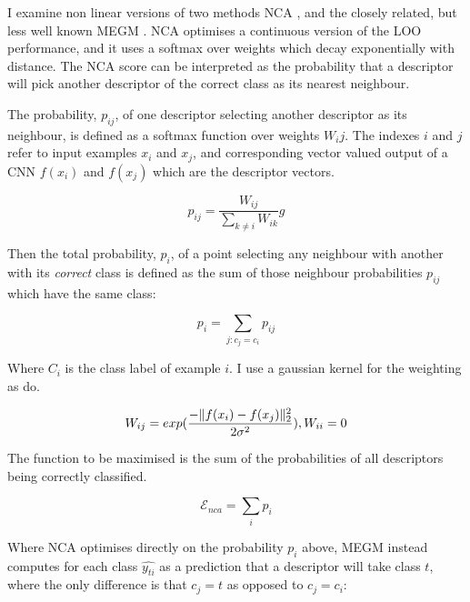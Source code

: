 I examine non linear versions of two methods \gls{NCA} \cite{Goldberger2004}, and the closely related, but less well known \gls{MEGM} \cite {Zaidi2011}. \gls{NCA} optimises a continuous version of the \gls{LOO} performance, and it uses a softmax over weights which decay exponentially with distance. The \gls{NCA} score can be interpreted as the probability that a descriptor will pick another descriptor of the correct class as its nearest neighbour. 

The probability, $ p_{ij} $, of one descriptor selecting another descriptor as its neighbour, is defined as a softmax function over weights $W_ij$. The indexes $ i $ and $ j $ refer to input examples $x_i$ and $x_j$, and corresponding vector valued output of a \gls{CNN} $f(x_i)$ and $f(x_j)$ which are the descriptor vectors.

\begin{equation}
\label{eq:nca_prob_pair}
p_{ij} =  \frac {W_{ij}} {\sum_{k \neq i}{W_{ik}}}g
\end{equation}

Then the total probability, $ p_i $, of a point selecting any neighbour with another with its \emph{correct} class is defined as the sum of those neighbour probabilities $p_{ij}$ which have the same class:

\begin{equation}
\label{eq:nca_prob}
p_{i} =  \sum_{j:c_j = c_i}{p_{ij}}
\end{equation}

Where $ C_i $ is the class label of example $ i $. I use a gaussian kernel for the weighting as \cite{Zaidi2011} do. 

\begin{equation}
 \label{eq:gaussian_kernel}
W_{ij} = exp(\frac{-\lVert f(x_i) - f(x_j) \rVert^2_2 }{2\sigma^2}), \space W_{ii} = 0
\end{equation}


The function to be maximised is the sum of the probabilities of all descriptors being correctly classified.

\begin{equation}
\label{eq:nca_loss}
\mathcal{E}_{nca} =  \sum_i {p_i}
\end{equation}

Where \gls{NCA} optimises directly on the probability $ p_{i} $ above, \gls{MEGM} instead computes for each class $ \hat{y_{ti}} $ as a prediction that a descriptor will take class $ t $, where the only difference is that $ c_j = t $ as opposed to $ c_j = c_i $:

